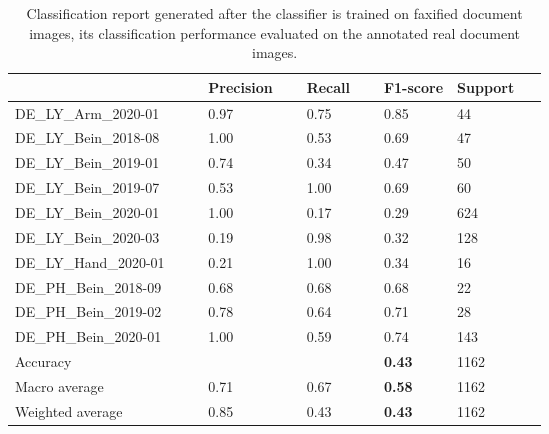 \begin{center}
\begin{table}[H]
    \begin{center}
    \begin{tabular}{P{0.22\linewidth} P{0.10\linewidth} P{0.10\linewidth} P{0.10\linewidth} P{0.10\linewidth}} 
        \toprule
            & Precision & Recall & F1-score & Support\\[0.0ex] 
        \midrule
        DE\_LY\_Arm\_2020-01 & 0.97 & 0.75 & 0.85 & 44\\[0.0ex]
        \midrule
        DE\_LY\_Bein\_2018-08 & 1.00 & 0.53 & 0.69 & 47\\[0.0ex]
        \midrule
        DE\_LY\_Bein\_2019-01 & 0.74 & 0.34 & 0.47 & 50\\[0.0ex]
        \midrule
        DE\_LY\_Bein\_2019-07 & 0.53 & 1.00 & 0.69 & 60\\[0.0ex]
        \midrule
        DE\_LY\_Bein\_2020-01 & 1.00 & 0.17 & 0.29 & 624\\[0.0ex]
        \midrule
        DE\_LY\_Bein\_2020-03 & 0.19 & 0.98 & 0.32 & 128\\[0.0ex]
        \midrule
        DE\_LY\_Hand\_2020-01 & 0.21 & 1.00 & 0.34 & 16\\[0.0ex]
        \midrule
        DE\_PH\_Bein\_2018-09 & 0.68 & 0.68 & 0.68 & 22\\[0.0ex]
        \midrule
        DE\_PH\_Bein\_2019-02 & 0.78 & 0.64 & 0.71 & 28\\[0.0ex]
        \midrule
        DE\_PH\_Bein\_2020-01 & 1.00 & 0.59 & 0.74 & 143\\[0.0ex]
        \midrule
        \midrule
        Accuracy              &      &      & \bf{0.43} & 1162\\[0.0ex]
        Macro average             & 0.71 & 0.67 & \bf{0.58} & 1162\\[0.0ex]
        Weighted average          & 0.85 & 0.43 & \bf{0.43} & 1162\\[0.0ex]

        \bottomrule
    \end{tabular}
    \caption[Classification report generated after the classifier is trained on faxified document images, its classification performance evaluated on the annotated real document images.]{Classification report generated after the classifier is trained on faxified document images, its classification performance evaluated on the annotated real document images.}
    \label{table:FaxifiedClassificationReport}
    \end{center}
\end{table}
\end{center}







